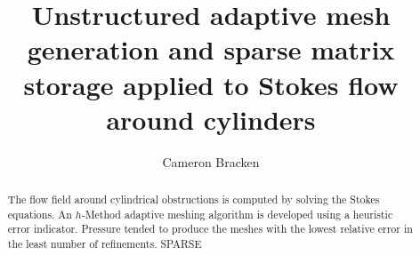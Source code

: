 \documentclass[wrr]{agutex}  %
\begin{document}
%
%


\title{Unstructured adaptive mesh generation and sparse matrix storage applied to Stokes flow around cylinders}

%
%

\author{Cameron Bracken}


%
%


\begin{abstract}
The flow field around cylindrical obstructions is computed by solving the Stokes equations.  An $h$-Method adaptive meshing algorithm is developed using a heuristic error indicator.  Pressure tended to produce the meshes with the lowest relative error in the least number of refinements.  SPARSE 
\end{abstract}

%
%

%
\end{document}
